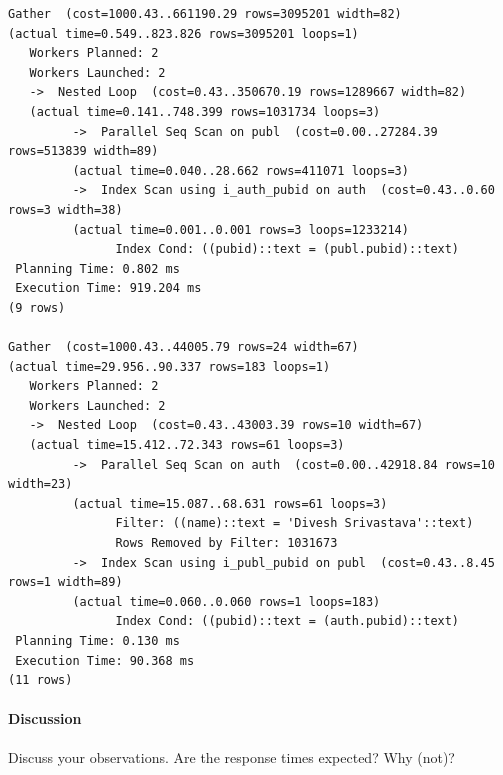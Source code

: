 \documentclass[11pt]{scrartcl}
\begin{document}
{\small
\parskip0pt\begin{verbatim}
Gather  (cost=1000.43..661190.29 rows=3095201 width=82) 
(actual time=0.549..823.826 rows=3095201 loops=1)
   Workers Planned: 2
   Workers Launched: 2
   ->  Nested Loop  (cost=0.43..350670.19 rows=1289667 width=82) 
   (actual time=0.141..748.399 rows=1031734 loops=3)
         ->  Parallel Seq Scan on publ  (cost=0.00..27284.39 rows=513839 width=89) 
         (actual time=0.040..28.662 rows=411071 loops=3)
         ->  Index Scan using i_auth_pubid on auth  (cost=0.43..0.60 rows=3 width=38) 
         (actual time=0.001..0.001 rows=3 loops=1233214)
               Index Cond: ((pubid)::text = (publ.pubid)::text)
 Planning Time: 0.802 ms
 Execution Time: 919.204 ms
(9 rows)

Gather  (cost=1000.43..44005.79 rows=24 width=67) 
(actual time=29.956..90.337 rows=183 loops=1)
   Workers Planned: 2
   Workers Launched: 2
   ->  Nested Loop  (cost=0.43..43003.39 rows=10 width=67) 
   (actual time=15.412..72.343 rows=61 loops=3)
         ->  Parallel Seq Scan on auth  (cost=0.00..42918.84 rows=10 width=23) 
         (actual time=15.087..68.631 rows=61 loops=3)
               Filter: ((name)::text = 'Divesh Srivastava'::text)
               Rows Removed by Filter: 1031673
         ->  Index Scan using i_publ_pubid on publ  (cost=0.43..8.45 rows=1 width=89) 
         (actual time=0.060..0.060 rows=1 loops=183)
               Index Cond: ((pubid)::text = (auth.pubid)::text)
 Planning Time: 0.130 ms
 Execution Time: 90.368 ms
(11 rows)
\end{verbatim}}

\paragraph{Discussion}

Discuss your observations. Are the response times expected? Why (not)?
\end{document}
